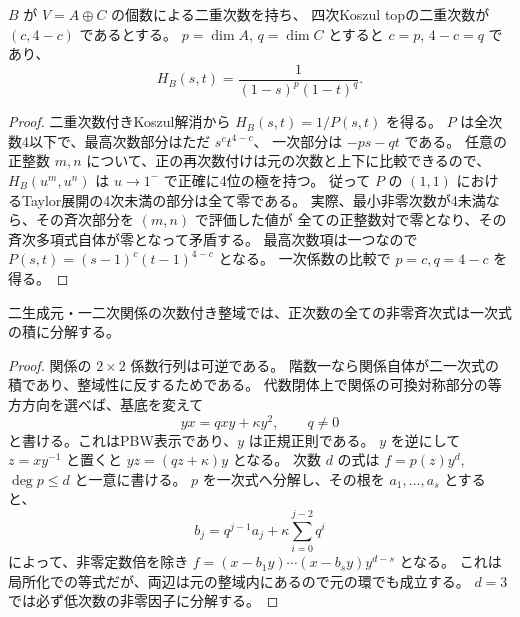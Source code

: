 \begin{lemma}\label{lem:h3-bigraded-top-index}
$B$ が $V=A\oplus C$ の個数による二重次数を持ち、
四次Koszul topの二重次数が $(c,4-c)$ であるとする。
$p=\dim A$, $q=\dim C$ とすると $c=p$, $4-c=q$ であり、
\[
 H_B(s,t)=\frac1{(1-s)^p(1-t)^q}.
\]
\end{lemma}
\begin{proof}
二重次数付きKoszul解消から $H_B(s,t)=1/P(s,t)$ を得る。
$P$ は全次数4以下で、最高次数部分はただ $s^ct^{4-c}$、
一次部分は $-ps-qt$ である。
任意の正整数 $m,n$ について、正の再次数付けは元の次数と上下に比較できるので、
$H_B(u^m,u^n)$ は $u\to1^-$ で正確に4位の極を持つ。
従って $P$ の $(1,1)$ におけるTaylor展開の4次未満の部分は全て零である。
実際、最小非零次数が4未満なら、その斉次部分を $(m,n)$ で評価した値が
全ての正整数対で零となり、その斉次多項式自体が零となって矛盾する。
最高次数項は一つなので
$P(s,t)=(s-1)^c(t-1)^{4-c}$ となる。
一次係数の比較で $p=c,q=4-c$ を得る。
\end{proof}

\begin{lemma}\label{lem:h3-binary-cubic-factors}
二生成元・一二次関係の次数付き整域では、正次数の全ての非零斉次式は一次式の積に分解する。
\end{lemma}
\begin{proof}
関係の $2\times2$ 係数行列は可逆である。
階数一なら関係自体が二一次式の積であり、整域性に反するためである。
代数閉体上で関係の可換対称部分の等方方向を選べば、基底を変えて
\[
 yx=qxy+\kappa y^2,\qquad q\ne0
\]
と書ける。これはPBW表示であり、$y$ は正規正則である。
$y$ を逆にして $z=xy^{-1}$ と置くと $yz=(qz+\kappa)y$ となる。
次数 $d$ の式は $f=p(z)y^d$, $\deg p\le d$ と一意に書ける。
$p$ を一次式へ分解し、その根を $a_1,\ldots,a_s$ とすると、
\[
 b_j=q^{j-1}a_j+\kappa\sum_{i=0}^{j-2}q^i
\]
によって、非零定数倍を除き
$f=(x-b_1y)\cdots(x-b_sy)y^{d-s}$ となる。
これは局所化での等式だが、両辺は元の整域内にあるので元の環でも成立する。
$d=3$ では必ず低次数の非零因子に分解する。
\end{proof}

